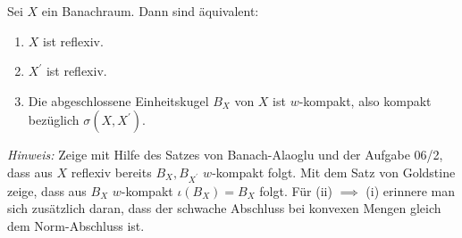 \begin{exercise}
Sei $X$ ein Banachraum. Dann sind äquivalent:
\begin{enumerate}[label = \roman*)]
  \item  $X$ ist reflexiv.
  \item $X^{\prime}$ ist reflexiv.
  \item Die abgeschlossene Einheitskugel $B_X$ von $X$ ist $w$-kompakt, also
  kompakt bezüglich $\sigma(X,X^{\prime})$.
\end{enumerate}
\textit{Hinweis:} Zeige mit Hilfe des Satzes von Banach-Alaoglu und der Aufgabe 06/2,
dass aus $X$ reflexiv bereits $B_X, B_{X^{\prime}}$ $w$-kompakt folgt. Mit dem Satz
von Goldstine zeige, dass aus $B_X$ $w$-kompakt $\iota(B_X) = B_X$ folgt.
Für (ii) $\implies$ (i) erinnere man sich zusätzlich daran, dass der schwache
Abschluss bei konvexen Mengen gleich dem Norm-Abschluss ist.
\end{exercise}
